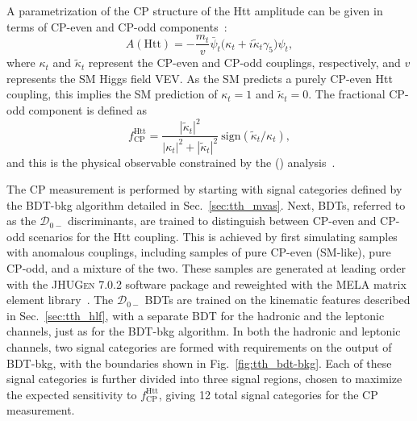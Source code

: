 A parametrization of the CP structure of the Htt amplitude can be given in terms of CP-even and CP-odd components~\cite{Gritsan:2016hjl}:\begin{equation}
    A(\text{Htt}) = - \frac{m_t}{v} \bar{\psi}_t \Big (\kappa_t + i \tilde{\kappa}_t \gamma_5 \Big) \psi_t,
\end{equation}
where $\kappa_t$ and $\tilde{\kappa}_t$ represent the CP-even and CP-odd couplings, respectively, and $v$ represents the SM Higgs field VEV.
As the SM predicts a purely CP-even Htt coupling, this implies the SM prediction of $\kappa_t = 1$ and $\tilde{\kappa}_t = 0$.
The fractional CP-odd component is defined as
\begin{equation}
    f^{\text{Htt}}_{\text{CP}} = \frac{|\tilde{\kappa}_t|^2}{|\kappa_t|^2 + |\tilde{\kappa}_t|^2}~\text{sign}(\tilde{\kappa}_t/\kappa_t),
\end{equation}
and this is the physical observable constrained by the \ttH (\Hgg) analysis~\cite{tth_observation}.

The CP measurement is performed by starting with signal categories defined by the BDT-bkg algorithm detailed in Sec.~\ref{sec:tth_mvas}.
Next, BDTs, referred to as the $\mathcal D_{0-}$ discriminants, are trained to distinguish between CP-even and CP-odd scenarios for the Htt coupling.
This is achieved by first simulating \ttH samples with anomalous couplings, including samples of pure CP-even (SM-like), pure CP-odd, and a mixture of the two.
These samples are generated at leading order with the \textsc{JHUGen} 7.0.2 software package and reweighted with the MELA matrix element library~\cite{Gritsan:2016hjl,Gao:2010qx,Bolognesi:2012mm,Anderson:2013afp}.
The $\mathcal D_{0-}$ BDTs are trained on the kinematic features described in Sec.~\ref{sec:tth_hlf}, with a separate BDT for the hadronic and the leptonic channels, just as for the BDT-bkg algorithm.
In both the hadronic and leptonic channels, two signal categories are formed with requirements on the output of BDT-bkg, with the boundaries shown in Fig.~\ref{fig:tth_bdt-bkg}.
Each of these signal categories is further divided into three signal regions, chosen to maximize the expected sensitivity to $f^{\text{Htt}}_{\text{CP}}$, giving 12 total signal categories for the CP measurement.

